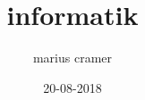 \documentclass{article}
\title{informatik}
\author{marius cramer}
\date{20-08-2018}
\begin{document}
\maketitle

\section{}
\end{document}
